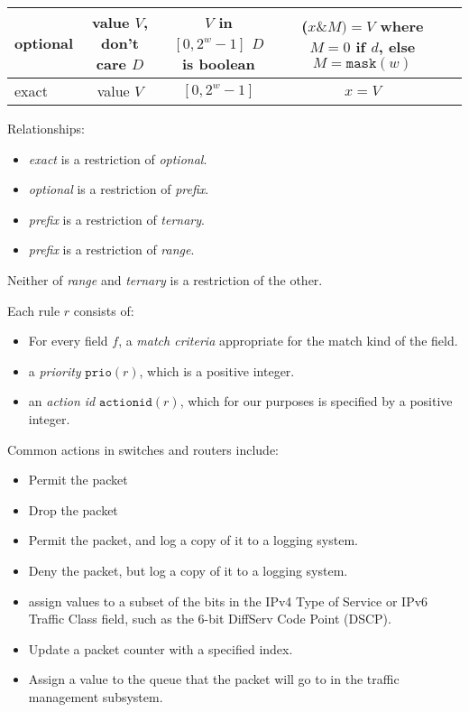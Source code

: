 \documentclass[acmsmall]{acmart}
\newcommand*\BitAnd{\mathbin{\&}}
\newcommand{\prio}[1]{}
\renewcommand{\prio}[1]{\ensuremath{\mathtt{prio}({#1})}}
\newcommand{\actionid}[1]{}
\renewcommand{\actionid}[1]{\ensuremath{\mathtt{actionid}({#1})}}
\newcommand{\fullmask}[1]{}
\renewcommand{\fullmask}[1]{\ensuremath{\mathtt{mask}({#1})}}
\begin{document}
\begin{table*}
\begin{tabular}{lcccl}
    \midrule
      optional
    & \makecell{value $V$, \\ don't care $D$}
    & \makecell{$V$ in $[0, 2^w-1]$ \\ $D$ is boolean}
    & \makecell{($x \BitAnd M) = V$ \\ where $M=0$ if $d$, \\ else $M=\fullmask{w}$}
    & 
    \\

    \midrule
      exact
    & value $V$
    & $[0, 2^w-1]$
    & $x = V$
    & 
    \\

  \bottomrule
\end{tabular}
\end{table*}

Relationships:
\begin{itemize}
\item {\em exact} is a restriction of {\em optional}.
\item {\em optional} is a restriction of {\em prefix}.
\item {\em prefix} is a restriction of {\em ternary}.
\item {\em prefix} is a restriction of {\em range}.
\end{itemize}
Neither of {\em range} and {\em ternary} is a restriction of the other.

\begin{definition}[rule]
\label{defn:rule}
Each rule $r$ consists of:
\begin{itemize}
\item For every field $f$, a {\em match criteria} appropriate for the match kind
  of the field.
\item a {\em priority} $\prio{r}$, which is a positive integer.
\item an {\em action id} $\actionid{r}$, which for our purposes is specified by a positive integer.
\end{itemize}
\end{definition}

Common actions in switches and routers include:
\begin{itemize}
\item Permit the packet
\item Drop the packet
\item Permit the packet, and log a copy of it to a logging system.
\item Deny the packet, but log a copy of it to a logging system.
\item assign values to a subset of the bits in the IPv4 Type of Service
or IPv6 Traffic Class field, such as the 6-bit DiffServ Code Point (DSCP).
\item Update a packet counter with a specified index.
\item Assign a value to the queue that the packet will go to in the traffic management subsystem.
\end{itemize}
\end{document}
